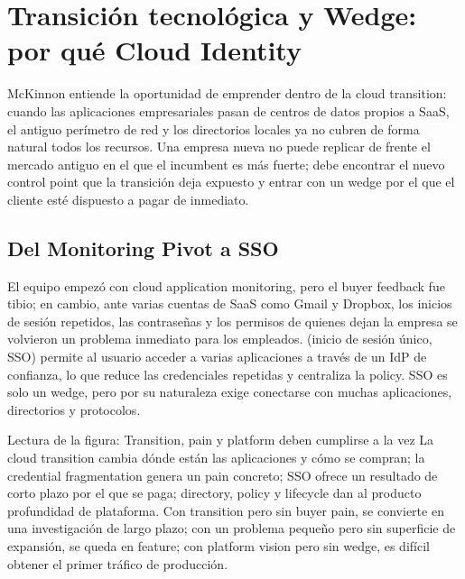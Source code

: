 \section{Transición tecnológica y Wedge: por qué Cloud Identity}

McKinnon entiende la oportunidad de emprender dentro de la cloud transition: cuando las aplicaciones empresariales pasan de centros de datos propios a SaaS, el antiguo perímetro de red y los directorios locales ya no cubren de forma natural todos los recursos. Una empresa nueva no puede replicar de frente el mercado antiguo en el que el incumbent es más fuerte; debe encontrar el nuevo control point que la transición deja expuesto y entrar con un wedge por el que el cliente esté dispuesto a pagar de inmediato.

\subsection{Del Monitoring Pivot a SSO}

El equipo empezó con cloud application monitoring, pero el buyer feedback fue tibio; en cambio, ante varias cuentas de SaaS como Gmail y Dropbox, los inicios de sesión repetidos, las contraseñas y los permisos de quienes dejan la empresa se volvieron un problema inmediato para los empleados.  (inicio de sesión único, SSO) permite al usuario acceder a varias aplicaciones a través de un IdP de confianza, lo que reduce las credenciales repetidas y centraliza la policy. SSO es solo un wedge, pero por su naturaleza exige conectarse con muchas aplicaciones, directorios y protocolos.


\begin{knowledgebox}{Lectura de la figura: Transition, pain y platform deben cumplirse a la vez}
La cloud transition cambia dónde están las aplicaciones y cómo se compran; la credential fragmentation genera un pain concreto; SSO ofrece un resultado de corto plazo por el que se paga; directory, policy y lifecycle dan al producto profundidad de plataforma. Con transition pero sin buyer pain, se convierte en una investigación de largo plazo; con un problema pequeño pero sin superficie de expansión, se queda en feature; con platform vision pero sin wedge, es difícil obtener el primer tráfico de producción.
\end{knowledgebox}

